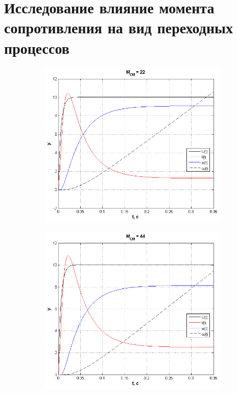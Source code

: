 \documentclass[fleqn, a4paper, 11pt, russian]{article}
\begin{document}
	\section{Исследование влияние момента сопротивления на вид переходных процессов}
	\begin{figure}[ht!]
		\centering
		\begin{subfigure}[b]{0.49\textwidth}
			\includegraphics[width = \textwidth]{M22}
		\end{subfigure}
		\hfill
		\begin{subfigure}[b]{0.49\textwidth}
			\includegraphics[width = \textwidth]{M44}
		\end{subfigure}
	\end{figure}
\end{document}
